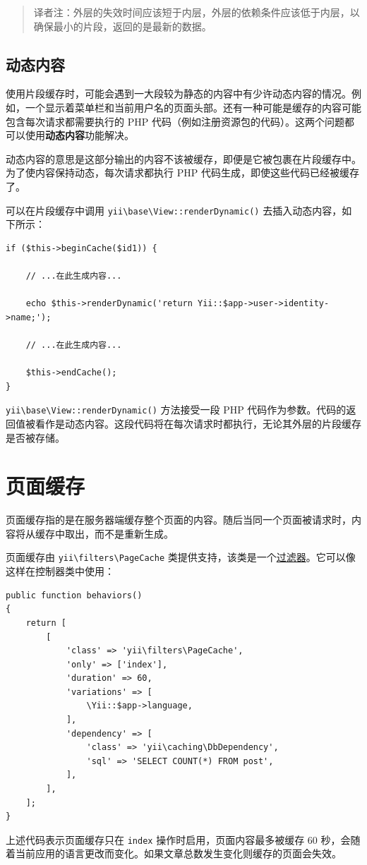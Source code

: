 \begin{quote}译者注：外层的失效时间应该短于内层，外层的依赖条件应该低于内层，以确保最小的片段，返回的是最新的数据。

\end{quote}
\subsection{动态内容 \label{caching-fragment.md::dynamic-content}}
使用片段缓存时，可能会遇到一大段较为静态的内容中有少许动态内容的情况。例如，一个显示着菜单栏和当前用户名的页面头部。还有一种可能是缓存的内容可能包含每次请求都需要执行的 PHP 代码（例如注册资源包的代码）。这两个问题都可以使用\textbf{动态内容}功能解决。

动态内容的意思是这部分输出的内容不该被缓存，即便是它被包裹在片段缓存中。为了使内容保持动态，每次请求都执行 PHP 代码生成，即使这些代码已经被缓存了。

可以在片段缓存中调用 \texttt{yii{\allowbreak{}\textbackslash}base{\allowbreak{}\textbackslash}View\allowbreak{}::\allowbreak{}renderDynamic()} 去插入动态内容，如下所示：

\lstset{language=php}\begin{lstlisting}
if ($this->beginCache($id1)) {

    // ...在此生成内容...

    echo $this->renderDynamic('return Yii::$app->user->identity->name;');

    // ...在此生成内容...

    $this->endCache();
}
\end{lstlisting}
\texttt{yii{\allowbreak{}\textbackslash}base{\allowbreak{}\textbackslash}View\allowbreak{}::\allowbreak{}renderDynamic()} 方法接受一段 PHP 代码作为参数。代码的返回值被看作是动态内容。这段代码将在每次请求时都执行，无论其外层的片段缓存是否被存储。



\label{caching-page.md}\section{页面缓存}
页面缓存指的是在服务器端缓存整个页面的内容。随后当同一个页面被请求时，内容将从缓存中取出，而不是重新生成。

页面缓存由 \texttt{yii{\allowbreak{}\textbackslash}filters{\allowbreak{}\textbackslash}PageCache} 类提供支持，该类是一个\hyperref[structure-filters.md]{过滤器}。它可以像这样在控制器类中使用：

\lstset{language=php}\begin{lstlisting}
public function behaviors()
{
    return [
        [
            'class' => 'yii\filters\PageCache',
            'only' => ['index'],
            'duration' => 60,
            'variations' => [
                \Yii::$app->language,
            ],
            'dependency' => [
                'class' => 'yii\caching\DbDependency',
                'sql' => 'SELECT COUNT(*) FROM post',
            ],
        ],
    ];
}
\end{lstlisting}
上述代码表示页面缓存只在 \lstinline|index| 操作时启用，页面内容最多被缓存 60 秒，会随着当前应用的语言更改而变化。如果文章总数发生变化则缓存的页面会失效。

